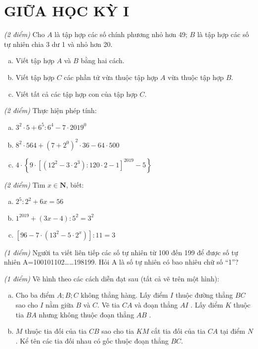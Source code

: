 
\section{GIỮA HỌC KỲ I}
\setcounter{ex}{0}
\begin{ex}  \textit{(2 điểm)} Cho $A$ là tập hợp các số chính phương nhỏ hơn 49; $B$ là tập hợp các số tự nhiên chia 3 dư 1 và nhỏ hơn 20. 
\begin{enumerate} [a)]
\item Viết tập hợp $A$ và $B$ bằng hai cách.
\item Viết tập hợp $C$ các phần tử vừa thuộc tập hợp $A$ vừa thuộc tập hợp $B$. 
\item Viết tất cả các tập hợp con của tập hợp $C$.

\end{enumerate}
\end{ex}     \begin{ex} \textit{(2 điểm)} Thực hiện phép tính:
\begin{enumerate} [a)]
\item ${3^2} \cdot 5 + {6^5}:{6^4} - 7 \cdot {2019^0}$
\item ${8^2} \cdot 564 + {\left( {7 + {2^0}} \right)^2} \cdot 36 - 64 \cdot 500$
\item $4 \cdot \left\{ {9 \cdot {{\left[ {\left( {{{12}^2} - 3 \cdot {2^3}} \right):120 \cdot 2 - 1} \right]}^{2019}} - 5} \right\}$ 

\end{enumerate}
\end{ex}     \begin{ex} \textit{(2 điểm)} Tìm $x \in \mathbf{N}$, biết:
 \begin{enumerate}[a)]
\item ${2^5}:{2^2} + 6x = 56$
\item	${1^{2019}} + \left( {3x - 4} \right):{5^2} = {3^2}$
\item	$\left[ {96 - 7 \cdot \left( {{{13}^2} - 5 \cdot {2^x}} \right)} \right]:11 = 3$

\end{enumerate}
\end{ex}     \begin{ex} \textit{(1 điểm)} Người ta viết liên tiếp các số tự nhiên từ 100 đến 199 để được số tự nhiên A=100101102……198199. Hỏi A là số tự nhiên có bao nhiêu chữ số “1”?\\
\end{ex}     \begin{ex} \textit{(1 điểm)} Vẽ hình theo các cách diễn đạt sau (tất cả vẽ trên một hình): 
 \begin{enumerate}[a)]
\item Cho ba điểm  $A;B;C$ không thẳng hàng. Lấy điểm $I$ thuộc đường thẳng $BC$ sao cho $I$  nằm giữa $B$ và $C$. Vẽ tia $CA$ và đoạn thẳng $AI$ . Lấy điểm $K$  thuộc tia $BA$ nhưng không thuộc đoạn thẳng $AB$ . 
\item $M$ thuộc tia đối của tia $CB$  sao cho tia $KM$  cắt tia đối của tia $CA$ tại điểm $N$. Kể tên các tia đối nhau có gốc thuộc đoạn thẳng $BC$.


\end{enumerate}
\end{ex}
